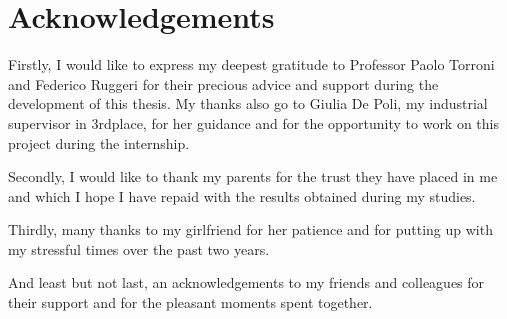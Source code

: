 
\cleardoublepage
{}
{}



\begingroup
\let\clearpage\relax
\let\cleardoublepage\relax
\let\cleardoublepage\relax

\chapter*{Acknowledgements}

\noindent Firstly, I would like to express my deepest gratitude to Professor Paolo Torroni and Federico Ruggeri for their precious advice and support during the development of this thesis. My thanks also go to Giulia De Poli, my industrial supervisor in 3rdplace, for her guidance and for the opportunity to work on this project during the internship.

\noindent Secondly, I would like to thank my parents for the trust they have placed in me and which I hope I have repaid with the results obtained during my studies.

\noindent Thirdly, many thanks to my girlfriend for her patience and for putting up with my stressful times over the past two years.

\noindent And least but not last, an acknowledgements to my friends and colleagues for their support and for the pleasant moments spent together.



